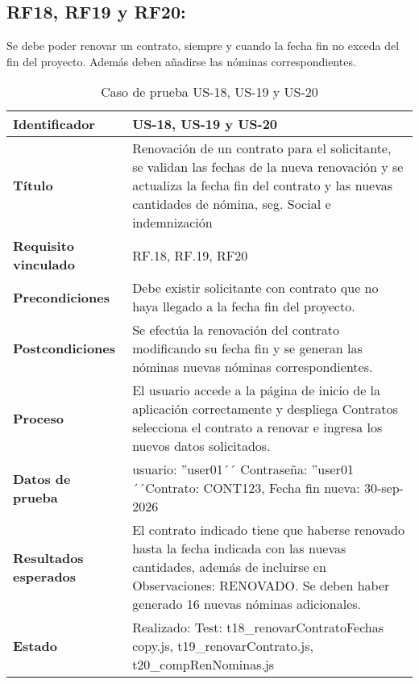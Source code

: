 \subsection{RF18, RF19 y RF20:} Se debe poder renovar un contrato, siempre y cuando la fecha fin no exceda del fin del proyecto. Además deben añadirse las nóminas correspondientes.
\begin{table}[H]
	\centering
	\renewcommand{\arraystretch}{1.3} 
	\begin{tabularx}{\textwidth}{|l|X|}
		\hline
		\textbf{Identificador} & US-18, US-19 y US-20 \\
		\hline
		\textbf{Título} & Renovación de un contrato para el solicitante, se validan las fechas de la nueva renovación y se actualiza la fecha fin del contrato y las nuevas cantidades de nómina, seg. Social e indemnización	\\
		\hline
		\textbf{Requisito vinculado} & RF.18, RF.19, RF20 \\
		\hline
		\textbf{Precondiciones} & Debe existir solicitante con contrato que no haya llegado a la fecha fin del proyecto.\\
		\hline
		\textbf{Postcondiciones} & Se efectúa la renovación del contrato modificando su fecha fin y se generan las nóminas nuevas nóminas correspondientes. \\
		\hline
		\textbf{Proceso} & El usuario accede a la página de inicio de la aplicación correctamente y despliega Contratos selecciona el contrato a renovar e ingresa los nuevos datos solicitados. \\
		\hline
		\textbf{Datos de prueba} & usuario: ''user01´´ Contraseña: ''user01´´Contrato: CONT123, Fecha fin nueva: 30-sep-2026
		\\
		\hline
		\textbf{Resultados esperados} & El contrato indicado tiene que haberse renovado hasta la fecha indicada con las nuevas cantidades, además de incluirse en Observaciones: RENOVADO. Se deben haber generado 16 nuevas nóminas adicionales. \\
		\hline
		\textbf{Estado} & Realizado: Test: t18\_renovarContratoFechas copy.js, t19\_renovarContrato.js, t20\_compRenNominas.js \\
		\hline
	\end{tabularx}
	\caption{Caso de prueba US-18, US-19 y US-20}
	\label{tab:caso_uso18}
\end{table}

